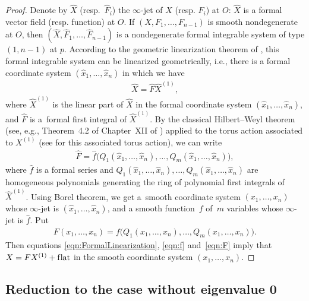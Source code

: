 \documentclass[pdftex]{sigma}
\numberwithin{equation}{section}
\begin{document}
\begin{proof}
Denote by $\hat{X}$ (resp.~$\hat F_i$) the $\infty$-jet of $X$ (resp. $F_i$) at $O$: $\hat{X}$ is a formal vector f\/ield (resp. function)
at $O$. If $(X,F_1,\dots,F_{n-1})$ is smooth nondegenerate at $O$, then
$(\hat{X},\hat{F}_1,\dots,\hat{F}_{n-1})$ is a nondegenerate formal integrable system of type $(1,n-1)$ at $p$.
According to the geometric linearization theorem of \cite{Zung-Nondegenerate2015},
this formal integrable system can be linearized geometrically, i.e., there is a formal coordinate system
$(\hat x_1,\dots, \hat x_n)$ in which we have
\begin{gather} \label{eqn:FormalLinearization}
\hat X = \hat F \hat X^{(1)},
\end{gather}
 where $\hat X^{(1)}$ is the linear part of $\hat X$ in the formal coordinate system
$(\hat x_1,\dots, \hat x_n)$, and $\hat F$ is a~formal f\/irst integral of $\hat X^{(1)}$.
By the classical Hilbert--Weyl theorem (see, e.g., Theorem~4.2 of Chapter~XII of \cite{GSS-Bifurcation1988})
applied to the torus action associated to $X^{(1)}$ (see \cite{Zung-Poincare2002,Zung-Nondegenerate2015} for this associated torus action), we can write
\begin{gather} \label{eqn:f}
 \hat F = \hat f \big(Q_1(\hat x_1,\dots, \hat x_n),\dots, Q_m(\hat x_1,\dots, \hat x_n)\big),
\end{gather}
where $\hat f$ is a formal series and
$Q_1(\hat x_1,\dots, \hat x_n),\dots, Q_m(\hat x_1,\dots, \hat x_n)$ are homogeneous polynomials
generating the ring of polynomial f\/irst integrals of $\hat X^{(1)}$.
Using Borel theorem, we get a~smooth coordinate system $(x_1,\dots,x_n)$ whose $\infty$-jet is
$(\hat x_1,\dots, \hat x_n)$, and a smooth function~$f$ of~$m$ variables whose $\infty$-jet is $\hat f$. Put
\begin{gather} \label{eqn:F}
F (x_1,\dots,x_n) = f\big(Q_1(x_1,\dots,x_n),\dots,Q_m(x_1,\dots,x_n)\big).
\end{gather}
Then equations \eqref{eqn:FormalLinearization}, \eqref{eqn:f} and~\eqref{eqn:F} imply that $X = FX^{(1)} + \text{f\/lat}$
in the smooth coordinate system $(x_1,\dots,x_n)$.
\end{proof}

\subsection{Reduction to the case without eigenvalue 0}\label{subsection:ReductionToParametrizedCase}
\end{document}
